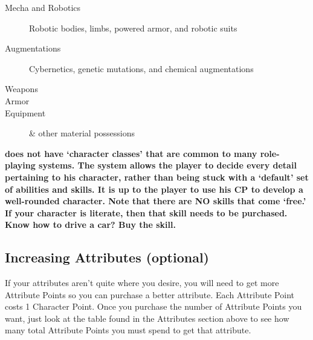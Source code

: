 \documentclass[twoside]{book}
\begin{document}
\begin{itemize}
{\begin{description}
    
  \item[ Mecha and Robotics ] 
    {  
     Robotic bodies, limbs, powered armor, and
                       robotic suits 
    }
  
  \item[ Augmentations ] 
    {  
     Cybernetics, genetic mutations, and chemical
                       augmentations 
    }
  
  \item[ Weapons ] 
    {  
    
    }
  
  \item[ Armor ] 
    {  
    
    }
  
  \item[ Equipment ] 
    {  
      \& other material possessions 
    }
  
\end{description}
  
                
    }
    
              
\end{itemize}
  

 \textbf{\APATHY{}  does not have `character
              classes' that are common to many role-playing
              systems. The \APATHY{}  system allows the player to decide
              every detail pertaining to his character, rather than being
              stuck with a `default' set of abilities and
              skills. It is up to the player to use his CP to develop a
              well-rounded character. Note that there are NO skills that
              come `free.' If your character is literate,
              then that skill needs to be purchased. Know how to drive a
              car? Buy the skill.
            }


    

\subsection{Increasing Attributes (optional)}
    
    {  
     If your attributes aren't quite where you
               desire, you will need to get more Attribute Points so you
               can purchase a better attribute. Each Attribute Point
               costs 1 Character Point. Once you purchase the number of
               Attribute Points you want, just look at the table found in
               the Attributes section above to see how many total
               Attribute Points you must spend to get that attribute.
               
    }
  
\end{document}
